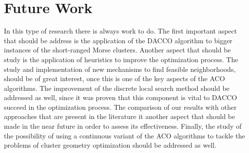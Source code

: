 \section{Future Work}

In this type of research there is always work to do. The first important aspect that should be address is the application of the DACCO algorithm to bigger instances of the short-ranged Morse clusters. Another aspect that should be study is the application of heuristics to improve the optimization process. The study and implementation of new mechanisms to find feasible neighborhoods, should be of great interest, once this is one of the key aspects of the ACO algorithms. The improvement of the discrete local search method should be addressed as well, since it was proven that this component is vital to DACCO succeed in the optimization process. The comparison of our results with other approaches that are present in the literature it another aspect that should be made in the near future in order to assess its effectiveness. Finally, the study of the  possibility of using a continuous variant of the ACO algorithms to tackle the problems of cluster geometry optimization should be addressed as well.





